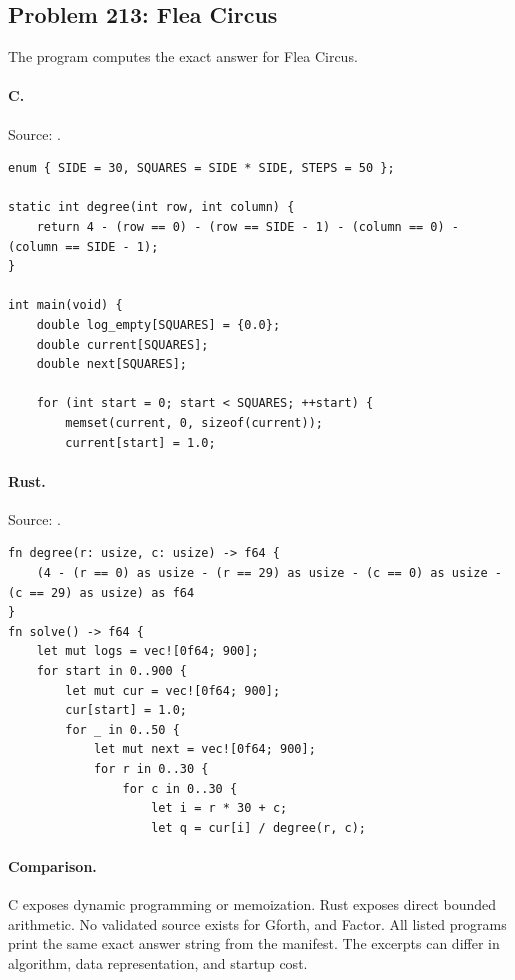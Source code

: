 \subsection{Problem 213: Flea Circus}
\label{walkthrough:p213}
The program computes the exact answer for Flea Circus.

\paragraph{C.} Source: .
\begin{lstlisting}
enum { SIDE = 30, SQUARES = SIDE * SIDE, STEPS = 50 };

static int degree(int row, int column) {
    return 4 - (row == 0) - (row == SIDE - 1) - (column == 0) - (column == SIDE - 1);
}

int main(void) {
    double log_empty[SQUARES] = {0.0};
    double current[SQUARES];
    double next[SQUARES];

    for (int start = 0; start < SQUARES; ++start) {
        memset(current, 0, sizeof(current));
        current[start] = 1.0;
\end{lstlisting}

\paragraph{Rust.} Source: .
\begin{lstlisting}
fn degree(r: usize, c: usize) -> f64 {
    (4 - (r == 0) as usize - (r == 29) as usize - (c == 0) as usize - (c == 29) as usize) as f64
}
fn solve() -> f64 {
    let mut logs = vec![0f64; 900];
    for start in 0..900 {
        let mut cur = vec![0f64; 900];
        cur[start] = 1.0;
        for _ in 0..50 {
            let mut next = vec![0f64; 900];
            for r in 0..30 {
                for c in 0..30 {
                    let i = r * 30 + c;
                    let q = cur[i] / degree(r, c);
\end{lstlisting}

\paragraph{Comparison.}
C exposes dynamic programming or memoization. Rust exposes direct bounded arithmetic.
No validated source exists for Gforth, and Factor.
All listed programs print the same exact answer string from the manifest. The excerpts can differ in algorithm, data representation, and startup cost.

